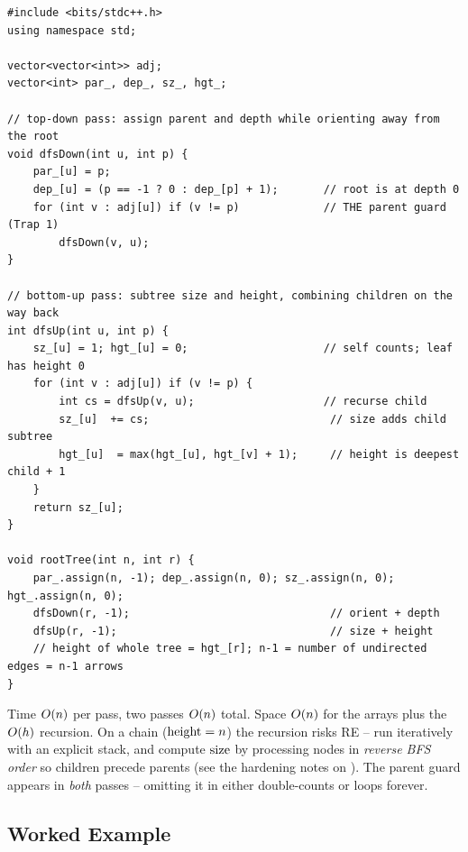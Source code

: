 \begin{lstlisting}[caption={Root an undirected adjacency list; parent/depth (top-down), size/height (bottom-up)}, label={lst:c04-root}]
#include <bits/stdc++.h>
using namespace std;

vector<vector<int>> adj;
vector<int> par_, dep_, sz_, hgt_;

// top-down pass: assign parent and depth while orienting away from the root
void dfsDown(int u, int p) {
    par_[u] = p;
    dep_[u] = (p == -1 ? 0 : dep_[p] + 1);       // root is at depth 0
    for (int v : adj[u]) if (v != p)             // THE parent guard (Trap 1)
        dfsDown(v, u);
}

// bottom-up pass: subtree size and height, combining children on the way back
int dfsUp(int u, int p) {
    sz_[u] = 1; hgt_[u] = 0;                     // self counts; leaf has height 0
    for (int v : adj[u]) if (v != p) {
        int cs = dfsUp(v, u);                    // recurse child
        sz_[u]  += cs;                            // size adds child subtree
        hgt_[u]  = max(hgt_[u], hgt_[v] + 1);     // height is deepest child + 1
    }
    return sz_[u];
}

void rootTree(int n, int r) {
    par_.assign(n, -1); dep_.assign(n, 0); sz_.assign(n, 0); hgt_.assign(n, 0);
    dfsDown(r, -1);                               // orient + depth
    dfsUp(r, -1);                                 // size + height
    // height of whole tree = hgt_[r]; n-1 = number of undirected edges = n-1 arrows
}
\end{lstlisting}
\begin{complexitybox}
Time $O(n)$ per pass, two passes $O(n)$ total. Space $O(n)$ for the arrays
plus the $O(h)$ recursion. On a chain ($\operatorname{height} = n$) the recursion risks RE --
run  iteratively with an explicit stack, and compute $\operatorname{size}$ by processing
nodes in \emph{reverse BFS order} so children precede parents (see the hardening notes on
). The parent guard appears in \emph{both} passes -- omitting it
in either double-counts or loops forever.
\end{complexitybox}

\subsection{Worked Example}

